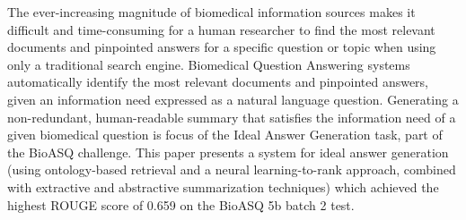 The ever-increasing magnitude of biomedical information sources makes it difficult and time-consuming for a human researcher to find the most relevant documents and pinpointed answers for a specific question or topic when using only a traditional search engine.  Biomedical Question Answering systems automatically identify the most relevant documents and pinpointed answers, given an information need expressed as a natural language question. Generating a non-redundant, human-readable summary that satisfies the information need of a given biomedical question is focus of the  Ideal Answer Generation task, part of the BioASQ challenge. This paper presents a system for ideal answer generation (using ontology-based retrieval and a neural learning-to-rank approach, combined with extractive and abstractive summarization techniques) which achieved the highest ROUGE score of 0.659 on the BioASQ 5b batch 2 test.
